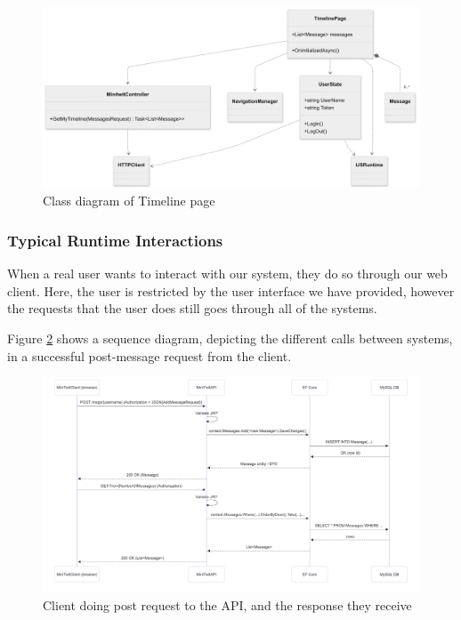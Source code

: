 \begin{figure}[H]
    \centering
    \includegraphics[width=1\linewidth]{images/ClientClass2.png}
    \caption{Class diagram of Timeline page}
    \label{fig:ClientClass}
\end{figure}

\subsubsection{Typical Runtime Interactions}
When a real user wants to interact with our system, they do so through our web client. Here, the user is restricted by the user interface we have provided, however the requests that the user does still goes through all of the systems.

Figure \ref{fig:runtimeseq} shows a sequence diagram, depicting the different calls between systems, in a successful post-message request from the client.

\begin{figure}[H]
    \centering
    \includegraphics[width=1\linewidth]{uml/Editor _ Mermaid Chart-2025-05-28-100914.png}
    \caption{Client doing post request to the API, and the response they receive}
    \label{fig:runtimeseq}
\end{figure}

